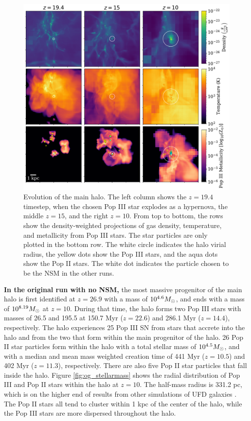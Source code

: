 \documentclass[fleqn,usenatbib]{mnras}
\begin{document}
\begin{figure} 
	\includegraphics[width=\textwidth]{plots/OG_evolution.pdf}
	\caption[Projections of the density, temperature and Pop III metallicity of the main halo through time.]{Evolution of the main halo. The left column shows the $z = 19.4$ timestep, when the chosen Pop III star explodes as a hypernova, the middle $z = 15$, and the right $z = 10$. From top to bottom, the rows show the density-weighted projections of gas density, temperature, and metallicity from Pop III stars. The star particles are only plotted in the bottom row. The white circle indicates the halo virial radius, the yellow dots show the Pop III stars, and the aqua dots show the Pop II stars. The white dot indicates the particle chosen to be the NSM in the other runs.}
	\label{fig:og_evolution}
\end{figure}

\textbf{In the original run with no NSM,} the most massive progenitor of the main halo is first identified at $z = 26.9$ with a mass of $10^{4.6} \Ms$, and ends with a mass of $10^{8.19} \Ms$ at $z = 10$. During that time, the halo forms two Pop III stars with masses of 26.5 \Ms{} and 195.5 \Ms{} at 150.7 Myr ($z = 22.6$) and 286.1 Myr ($z = 14.4$), respectively. The halo experiences 25 Pop III SN from stars that accrete into the halo and from the two that form within the main progenitor of the halo. 26 Pop II star particles form within the halo with a total stellar mass of $10^{4.5} \Ms$, and with a median and mean mass weighted creation time of 441 Myr ($z = 10.5$) and 402 Myr ($z = 11.3$), respectively. There are also five Pop II star particles that fall inside the halo. Figure \ref{fig:og_stellarmass} shows the radial distribution of Pop III and Pop II stars within the halo at $z = 10$. The half-mass radius is 331.2 pc, which is on the higher end of results from other simulations of UFD galaxies \citep{Ricotti16}. The Pop II stars all tend to cluster within 1 kpc of the center of the halo, while the Pop III stars are more dispersed throughout the halo. 
\end{document}
